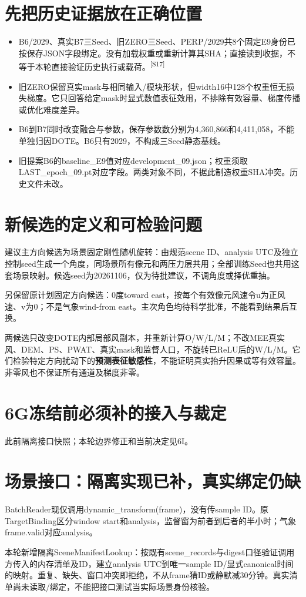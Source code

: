 \documentclass[UTF8,10.5pt,a4paper,fontset=none]{ctexart}
\newcommand{\evi}[1]{\textsuperscript{\color{muted}[#1]}}
\newcommand{\pageheading}[2]{\clearpage\section*{#1}\textcolor{muted}{#2}\par\vspace{3pt}}
\begin{document}
\section*{先把历史证据放在正确位置}
\begin{itemize}
\item B6/2029、真实B7三Seed、旧ZERO三Seed、PERP/2029共8个固定E9身份已按保存JSON字段绑定。没有加载权重或重新计算其SHA；直接读到收据，不等于本轮直接验证历史执行或载荷。\evi{S17}
\item 旧ZERO保留真实mask与相同输入/模块形状，但width16中128个权重恒无损失梯度。它只回答给定mask时显式数值表征效用，不排除有效容量、梯度传播或优化难度差异。
\item B6到B7同时改变融合与参数，保存参数数分别为4,360,866和4,411,058，不能单独归因DOTE。B6只有2029，不构成三Seed静态基线。
\item 旧提案B6的baseline\_E9值对应development\_09.json；权重须取LAST\_epoch\_09.pt对应字段。两类对象不同，不据此制造权重SHA冲突。历史文件未改。
\end{itemize}

\section*{新候选的定义和可检验问题}
建议主方向候选为场景固定刚性随机旋转：由规范scene ID、analysis UTC及独立控制seed生成一个角度，同场景所有像元和两压力层共用；全部训练Seed也共用这套场景映射。候选seed为20261106，仅为待批建议，不调角度或择优重抽。

另保留原计划固定方向候选：0度toward east，按每个有效像元风速令u为正风速、v为0；不是气象wind-from east。主次角色均待科学批准，不能看到结果后互换。

两候选只改变DOTE内部局部风副本，并重新计算O/W/L/M；不改MEE真实风、DEM、PS、PWAT、真实mask和监督人口，不旋转已ReLU后的W/L/M。它们检验特定方向扰动下的\textbf{预测表征敏感性}，不能证明真实抬升因果或等有效容量。非零风也不保证所有通道及梯度非零。

\pageheading{6G\quad 冻结前必须补的接入与裁定}{此前隔离接口快照；本轮边界修正和当前决定见6I。}
\section*{场景接口：隔离实现已补，真实绑定仍缺}
BatchReader现仅调用dynamic\_transform(frame)，没有传sample ID。原TargetBinding区分window start和analysis，监督窗为前者到后者的半小时；气象frame.valid对应analysis。

本轮新增隔离SceneManifestLookup：按既有scene\_records与digest口径验证调用方传入的内存清单及ID，建立analysis UTC到唯一sample ID/显式canonical时间的映射。重复、缺失、窗口冲突即拒绝，不从frame猜ID或静默减30分钟。真实清单尚未读取/绑定，不能把接口测试当实际场景身份核验。
\end{document}
